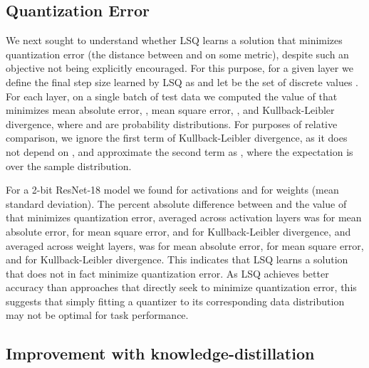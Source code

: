 \documentclass{article}
\begin{document}
\subsection{Quantization Error}
\label{sec:qe}

We next sought to understand whether LSQ learns a solution that minimizes quantization error (the distance between  and  on some metric), despite such an objective not being explicitly encouraged.
For this purpose, for a given layer we define the final step size learned by LSQ as  and let  be the set of discrete values .
For each layer, on a single batch of test data we computed the value of  that minimizes
mean absolute error, ,
mean square error, ,
and Kullback-Leibler divergence,  where  and  are probability distributions.
For purposes of relative comparison, we ignore the first term of Kullback-Leibler divergence, as it does not depend on , and approximate the second term as , where the expectation is over the sample distribution.


For a 2-bit ResNet-18 model we found  for activations and  for weights (mean  standard deviation).
The percent absolute difference between  and the value of  that minimizes quantization error, averaged across activation layers was  for mean absolute error,  for mean square error, and  for Kullback-Leibler divergence,
and averaged across weight layers, was  for  mean absolute error,  for mean square error, and  for Kullback-Leibler divergence.
This indicates that LSQ learns a solution that does not in fact minimize quantization error.
As LSQ achieves better accuracy than approaches that directly seek to minimize quantization error, this suggests that simply fitting a quantizer to its corresponding data distribution may not be optimal for task performance.



\subsection{Improvement with knowledge-distillation}
\end{document}
